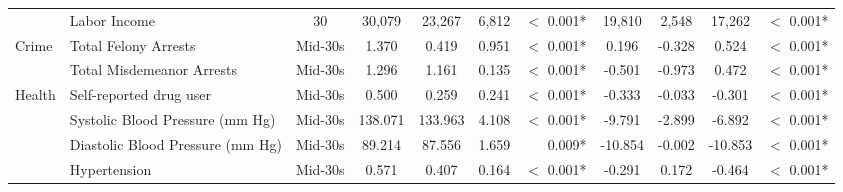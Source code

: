 \begin{tabular}{l l c c c c r c c c r}
 & Labor Income & 30 & 30,079 & 23,267 & 6,812 & $ < $ 0.001* & 19,810 & 2,548 & 17,262 & $ < $ 0.001* \\
Crime & Total Felony Arrests & Mid-30s & 1.370 & 0.419 & 0.951 & $ < $ 0.001* & 0.196 & -0.328 & 0.524 & $ < $ 0.001* \\
 & Total Misdemeanor Arrests & Mid-30s & 1.296 & 1.161 & 0.135 & $ < $ 0.001* & -0.501 & -0.973 & 0.472 & $ < $ 0.001* \\
Health & Self-reported drug user & Mid-30s & 0.500 & 0.259 & 0.241 & $ < $ 0.001* & -0.333 & -0.033 & -0.301 & $ < $ 0.001* \\
 & Systolic Blood Pressure (mm Hg) & Mid-30s & 138.071 & 133.963 & 4.108 & $ < $ 0.001* & -9.791 & -2.899 & -6.892 & $ < $ 0.001* \\
 & Diastolic Blood Pressure (mm Hg) & Mid-30s & 89.214 & 87.556 & 1.659 & 0.009* & -10.854 & -0.002 & -10.853 & $ < $ 0.001* \\
 & Hypertension & Mid-30s & 0.571 & 0.407 & 0.164 & $ < $ 0.001* & -0.291 & 0.172 & -0.464 & $ < $ 0.001* \\
\bottomrule
\end{tabular}
